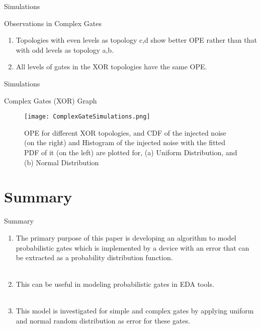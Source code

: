 \documentclass{beamer}
\begin{document}
\begin{frame}{Simulations}
    \begin{block}{Observations in Complex Gates}
    \begin{enumerate}
        \item Topologies with even levels as topology c,d show better OPE rather than that with odd levels as topology a,b.
        \item All levels of gates in the XOR topologies have the same OPE.
    \end{enumerate}
    \end{block}
\end{frame}

\begin{frame}{Simulations}
\begin{block}{Complex Gates (XOR) Graph}
\begin{figure}
    \centering
    \texttt{[image: ComplexGateSimulations.png]}
    \caption{OPE for different XOR topologies, and CDF of the injected noise (on the right) and Histogram of the injected noise with the fitted PDF of it (on the left) are plotted for, (a) Uniform Distribution, and (b) Normal Distribution}
    \label{fig:my_label}
\end{figure}
\end{block}
\end{frame}

\section{Summary}
\begin{frame}{Summary}
    \begin{enumerate}
        \item The primary purpose of this paper is developing an algorithm to model probabilistic gates which is implemented by a device with an error that can be extracted as a probability distribution function.\\\\
        \item This can be useful in modeling probabilistic gates in EDA tools.\\\\
        \item This model is investigated for simple and complex gates by applying uniform and normal random distribution as error for these gates.\\\\
    \end{enumerate}
\end{frame}
\end{document}

